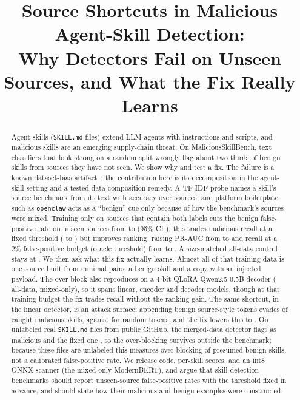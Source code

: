 \documentclass[conference]{IEEEtran}
\begin{document}
\title{Source Shortcuts in Malicious Agent-Skill Detection:\\
Why Detectors Fail on Unseen Sources, and What the Fix Really Learns}

\author{
}

\maketitle

\begin{abstract}
Agent skills (\texttt{SKILL.md} files) extend LLM agents with instructions and scripts, and malicious skills are an
emerging supply-chain threat. On MaliciousSkillBench, text classifiers that look strong on a random split
wrongly flag about two thirds of benign skills from sources they have not seen. We show why and test a fix.
The failure is a known dataset-bias artifact~\cite{arp2022}; the contribution here is its decomposition in
the agent-skill setting and a tested data-composition remedy.
A TF-IDF probe names a skill's source benchmark from its text with \ProbeAcc{} accuracy over
\ProbeSources{} sources, and platform boilerplate such as \texttt{openclaw} acts as a ``benign'' cue only
because of how the benchmark's sources were mixed. Training only on sources that contain both labels cuts the
benign false-positive rate on unseen sources from \FprAll{} to \FprMixed{} (95\% CI \FprMixedCI{}); this trades
malicious recall at a fixed threshold (\RecallAll{} to \RecallMixed{}) but improves ranking, raising PR-AUC
from \PrAll{} to \PrMixed{} and recall at a 2\% false-positive budget (oracle threshold) from \RecallAtTwoAll{} to \RecallAtTwoMixed{}.
A size-matched all-data control stays at \FprSizeMatched{}.
We then ask what this fix actually learns. Almost all of that training data is one source built from
minimal pairs: a benign skill and a copy with an injected payload. \MechanismSentence{}
\TransformerSentence{} The over-block also reproduces on a 4-bit QLoRA Qwen2.5-0.5B decoder
(\LoraFprAll{} all-data, \LoraFprMixed{} mixed-only), so it spans linear, encoder and decoder models,
though at that training budget the fix trades recall without the ranking gain. The same shortcut, in the
linear detector, is an attack surface: appending \EvasionK{} benign source-style tokens evades
\EvasionAsrAll{} of caught malicious skills, against \EvasionControlAll{} for random tokens, and the fix
lowers this to \EvasionAsrMixed{}.
On \WildN{} unlabeled real \texttt{SKILL.md} files from public GitHub, the merged-data detector flags
\WildFlaggedAll{} as malicious and the fixed one \WildFlaggedMixed{}, so the over-blocking survives outside
the benchmark; because these files are unlabeled this measures over-blocking of presumed-benign skills, not
a calibrated false-positive rate.
We release code, per-skill scores, and an int8 ONNX scanner (the mixed-only ModernBERT), and argue that
skill-detection benchmarks should report unseen-source false-positive rates with the threshold fixed in
advance, and should state how their malicious and benign examples were constructed.
\end{abstract}
\end{document}
